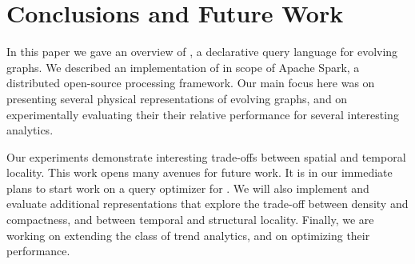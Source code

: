 \section{Conclusions and Future Work}
\label{sec:conc}

In this paper we gave an overview of \ql, a declarative query language
for evolving graphs.  We described an implementation of \ql in scope
of Apache Spark, a distributed open-source processing framework.  Our
main focus here was on presenting several physical representations of
evolving graphs, and on experimentally evaluating their their relative
performance for several interesting analytics.

Our experiments demonstrate interesting trade-offs between spatial and
temporal locality.  This work opens many avenues for future work.  It
is in our immediate plans to start work on a query optimizer for \ql.
We will also implement and evaluate additional \tg representations
that explore the trade-off between density and compactness, and
between temporal and structural locality.  Finally, we are working on
extending the class of trend analytics, and on optimizing their
performance.
